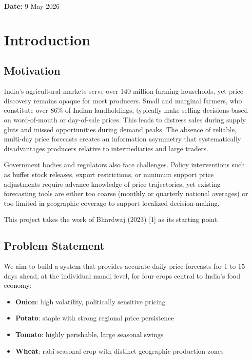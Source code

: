 \documentclass[12pt]{article}
\begin{document}
\textbf{Date:} 9 May 2026

\section{Introduction}

\subsection{Motivation}

India's agricultural markets serve over 140 million farming households, yet price discovery remains opaque for most producers. Small and marginal farmers, who constitute over 86\% of Indian landholdings, typically make selling decisions based on word-of-mouth or day-of-sale prices. This leads to distress sales during supply gluts and missed opportunities during demand peaks. The absence of reliable, multi-day price forecasts creates an information asymmetry that systematically disadvantages producers relative to intermediaries and large traders.

Government bodies and regulators also face challenges. Policy interventions such as buffer stock releases, export restrictions, or minimum support price adjustments require advance knowledge of price trajectories, yet existing forecasting tools are either too coarse (monthly or quarterly national averages) or too limited in geographic coverage to support localized decision-making.

This project takes the work of Bhardwaj (2023) [1] as its starting point.

\subsection{Problem Statement}

We aim to build a system that provides accurate daily price forecasts for 1 to 15 days ahead, at the individual mandi level, for four crops central to India's food economy:

\begin{itemize}
\item \textbf{Onion}: high volatility, politically sensitive pricing
\item \textbf{Potato}: staple with strong regional price persistence
\item \textbf{Tomato}: highly perishable, large seasonal swings
\item \textbf{Wheat}: rabi seasonal crop with distinct geographic production zones
\end{itemize}
\end{document}

